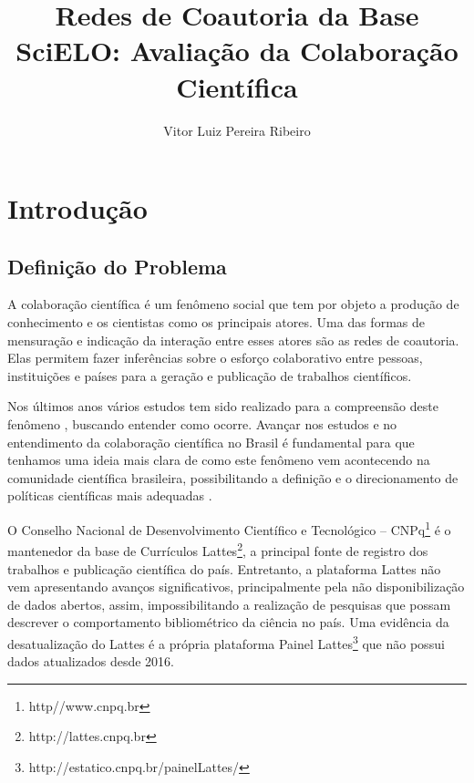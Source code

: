 \documentclass[12pt]{article}
\title{Redes de Coautoria da Base SciELO: Avaliação da Colaboração Científica}
\author{Vitor Luiz Pereira Ribeiro}
\begin{document}
 

\maketitle

  
     
  


\section{Introdução}

\subsection{\textbf{Definição do Problema}}

A colaboração científica é um fenômeno social que tem  por objeto a produção de conhecimento e os cientistas como os principais atores. 
Uma das formas de mensuração e indicação da interação entre esses atores são as redes de coautoria.
Elas permitem fazer inferências sobre o esforço colaborativo entre pessoas, instituições e países para a geração e publicação de trabalhos científicos.


Nos últimos anos vários estudos tem sido realizado para a compreensão deste fenômeno \citep{Maia2008}, buscando entender como ocorre. 
Avançar nos estudos e no entendimento da colaboração científica no Brasil é fundamental para que tenhamos uma ideia mais clara de como este fenômeno vem acontecendo na comunidade científica brasileira, possibilitando a definição e o direcionamento de políticas científicas mais adequadas \cite{Vanz2010}.

O Conselho Nacional de Desenvolvimento Científico e Tecnológico -- CNPq\footnote{http//www.cnpq.br} é o mantenedor da base de Currículos Lattes\footnote{http://lattes.cnpq.br}, a principal fonte de registro dos trabalhos e publicação científica do país. 
Entretanto, a plataforma Lattes não vem apresentando avanços significativos, principalmente pela não disponibilização de dados abertos, assim, impossibilitando a realização de pesquisas que possam descrever o comportamento bibliométrico da ciência no país.
Uma evidência da desatualização do Lattes é a própria plataforma Painel Lattes\footnote{http://estatico.cnpq.br/painelLattes/} que não possui dados atualizados desde 2016.
\end{document}
